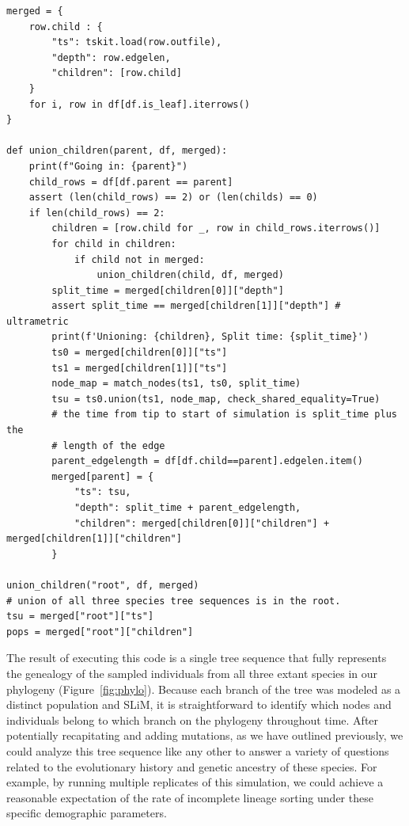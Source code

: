 \documentclass[12pt]{article}
\begin{document}
\begin{verbatim}
merged = {
    row.child : {
        "ts": tskit.load(row.outfile),
        "depth": row.edgelen,
        "children": [row.child]
    }
    for i, row in df[df.is_leaf].iterrows()
}

def union_children(parent, df, merged):
    print(f"Going in: {parent}")
    child_rows = df[df.parent == parent]
    assert (len(child_rows) == 2) or (len(childs) == 0)
    if len(child_rows) == 2:
        children = [row.child for _, row in child_rows.iterrows()]
        for child in children:
            if child not in merged:
                union_children(child, df, merged)
        split_time = merged[children[0]]["depth"]
        assert split_time == merged[children[1]]["depth"] # ultrametric
        print(f'Unioning: {children}, Split time: {split_time}')
        ts0 = merged[children[0]]["ts"]
        ts1 = merged[children[1]]["ts"]
        node_map = match_nodes(ts1, ts0, split_time)
        tsu = ts0.union(ts1, node_map, check_shared_equality=True)
        # the time from tip to start of simulation is split_time plus the
        # length of the edge
        parent_edgelength = df[df.child==parent].edgelen.item()
        merged[parent] = {
            "ts": tsu,
            "depth": split_time + parent_edgelength,
            "children": merged[children[0]]["children"] + merged[children[1]]["children"]
        }

union_children("root", df, merged)
# union of all three species tree sequences is in the root.
tsu = merged["root"]["ts"]
pops = merged["root"]["children"]
\end{verbatim}

The result of executing this code is a single tree sequence that fully represents the genealogy of the sampled individuals from all three extant species in our phylogeny
(Figure~\ref{fig:phylo}). Because each branch of the tree was modeled as a distinct population and SLiM, it is straightforward to identify which nodes and individuals belong
to which branch on the phylogeny throughout time. After potentially recapitating and adding mutations, as we have outlined previously, we could analyze this tree sequence
like any other to answer a variety of questions related to the evolutionary history and genetic ancestry of these species. For example, by running multiple replicates of this
simulation, we could achieve a reasonable expectation of the rate of incomplete lineage sorting under these specific demographic parameters.
\end{document}
